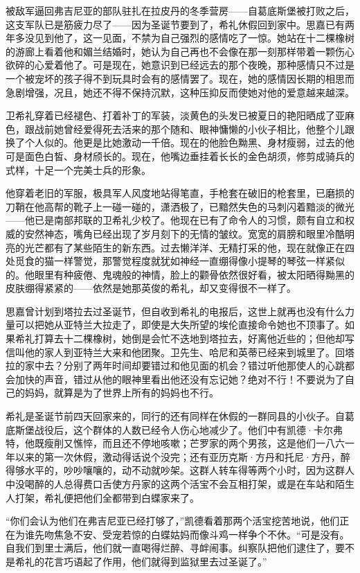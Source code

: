 \par 被敌军逼回弗吉尼亚的部队驻扎在拉皮丹的冬季营房——自葛底斯堡被打败之后，这支军队已是筋疲力尽了——因为圣诞节要到了，希礼休假回到家中。思嘉已有两年多没见到他了，这一见面，不禁为自己强烈的感情吃了一惊。她站在十二棵橡树的游廊上看着他和媚兰结婚时，她认为自己再也不会像在那一刻那样带着一颗伤心欲碎的心爱着他了。可是现在，她意识到已经远去的那个夜晚，那种感情只不过是一个被宠坏的孩子得不到玩具时会有的感情罢了。现在，她的感情因长期的相思而急剧增强，况且，她还不得不保持沉默，这种压抑反而使她对他的爱意越来越深。
\par 卫希礼穿着已经褪色、打着补丁的军装，淡黄色的头发已被夏日的艳阳晒成了亚麻色，跟战前她曾经爱得死去活来的那个随和、眼神慵懒的小伙子相比，他整个儿跟换了个人似的。他更是比她激动一千倍。现在的他脸色黝黑、身材瘦弱，过去的他可是面色白皙、身材颀长的。现在，他嘴边垂挂着长长的金色胡须，修剪成骑兵的式样，十足一个完美士兵的形象。
\par 他穿着老旧的军服，极具军人风度地站得笔直，手枪套在破旧的枪套里，已磨损的刀鞘在他高帮的靴子上一碰一碰的，潇洒极了，已黯然失色的马刺闪着黯淡的微光——他已是南部邦联的卫希礼少校了。他现在已有了命令人的习惯，颇有自立和权威的安然神态，嘴角已经出现了岁月刻下的无情的皱纹。宽宽的肩膀和眼里冷酷明亮的光芒都有了某些陌生的新东西。过去懒洋洋、无精打采的他，现在就像正在四处觅食的猫一样警觉，那警觉程度就犹如神经一直绷得像小提琴的琴弦一样紧似的。他眼里有种疲倦、鬼魂般的神情，脸上的颧骨依然很好看，被太阳晒得黝黑的皮肤绷得紧紧的——依然是她那英俊的希礼，却又变得很不一样了。
\par 思嘉曾计划到塔拉去过圣诞节，但自收到希礼的电报后，这世上就再也没有什么力量可以把她从亚特兰大拉走了，即使是大失所望的埃伦直接命令她也不顶事了。如果希礼打算去十二棵橡树，她倒是会忙不迭地到塔拉去，好离他近些的；但他却写信叫他的家人到亚特兰大来和他团聚。卫先生、哈尼和英蒂已经来到城里了。回塔拉的家中去？分别了两年时间却要错过和他见面的机会？错过听他那使人的心跳都会加快的声音，错过从他的眼神里看出他还没有忘记她？绝对不行！不要说为了自己的妈妈，就算是为了世界上所有的妈妈也不行。
\par 希礼是圣诞节前四天回家来的，同行的还有同样在休假的一群同县的小伙子。自葛底斯堡战役后，这个群体的人数已经令人伤心地减少了。他们中有凯德·卡尔弗特，他既瘦削又憔悴，而且还不停地咳嗽；芒罗家的两个男孩，这是他们一八六一年以来的第一次休假，激动得话说个没完；还有亚历克斯·方丹和托尼·方丹，醉得够水平的，吵吵嚷嚷的，动不动就吵架。这群人转车得等两个小时，因为这群人中没喝醉的人总得费口舌使方丹家的这两个活宝不会互相打架，或是在车站和陌生人打架，希礼便把他们全都带到白蝶家来了。
\par “你们会认为他们在弗吉尼亚已经打够了，”凯德看着那两个活宝挖苦地说，他们正在为谁先吻焦急不安、受宠若惊的白蝶姑妈而像斗鸡一样争个不休。“可是没有。自我们到里士满后，他们就一直喝得烂醉、寻衅闹事。纠察队把他们逮住了，要不是希礼的花言巧语起了作用，他们就得到监狱里去过圣诞了。”

